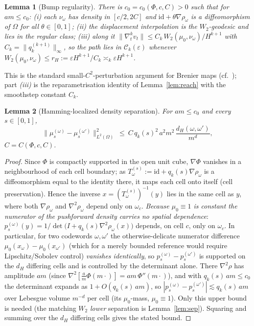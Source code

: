\documentclass[11pt]{article}
\newtheorem{lemma}{Lemma}
\theoremstyle{definition}
\theoremstyle{remark}
\newcommand{\Ck}{\mathcal{C}_k(\varepsilon)}
\begin{document}
\begin{lemma}[Bump regularity]\label{lem:bump}
There is $c_0=c_0(\Phi,c,C)>0$ such that for $am\le c_0$: \emph{(i)} each $\nu_\omega$ has density in
$[c/2,2C]$ and $\mathrm{id}+\theta\nabla\rho_\omega$ is a diffeomorphism of $\Omega$ for all
$\theta\in[0,1]$; \emph{(ii)} the displacement interpolation is the $W_2$-geodesic and lies in the
regular class; \emph{(iii)} along it $\|\nabla_t^k v_t\|\le C_k\,W_2(\mu_0,\nu_\omega)/H^{k+1}$ with
$C_k=\|q_k^{(k+1)}\|_\infty$, so the path lies in $\Ck$ whenever
$W_2(\mu_0,\nu_\omega)\le r_H:=\varepsilon H^{k+1}/C_k\asymp_k\varepsilon H^{k+1}$.
\end{lemma}
This is the standard small-$C^2$-perturbation argument for Brenier maps (cf.\ \cite{hutter,manole});
part \emph{(iii)} is the reparametrisation identity of Lemma~\ref{lem:reach} with the smoothstep
constant $C_k$.

\begin{lemma}[Hamming-localized density separation]\label{lem:kl}
For $am\le c_0$ and every $s\in[0,1]$,
\[
  \big\|\mu_s^{(\omega)}-\mu_s^{(\omega')}\big\|_{L^2(\Omega)}^2\ \le\ C\,q_k(s)^2\,a^2 m^2\,\frac{d_H(\omega,\omega')}{m^d},
\]
$C=C(\Phi,c,C)$.
\end{lemma}
\begin{proof}
Since $\Phi$ is compactly supported in the open unit cube, $\nabla\Phi$ vanishes in a neighbourhood
of each cell boundary; as $T^{(s)}_\omega:=\mathrm{id}+q_k(s)\nabla\rho_\omega$ is a diffeomorphism
equal to the identity there, it maps each cell onto itself (cell preservation). Hence the inverse
$x=(T^{(s)}_\omega)^{-1}(y)$ lies in the same cell as $y$, where both $\nabla\rho_\omega$ and
$\nabla^2\rho_\omega$ depend only on $\omega_c$. \emph{Because $\mu_0\equiv1$ is constant the
numerator of the pushforward density carries no spatial dependence}:
$p_s^{(\omega)}(y)=1/\det\!\big(I+q_k(s)\nabla^2\rho_\omega(x)\big)$ depends, on cell $c$, only on
$\omega_c$. In particular, for two codewords $\omega,\omega'$ the otherwise-delicate numerator
difference $\mu_0(x_\omega)-\mu_0(x_{\omega'})$ (which for a merely bounded reference would require
Lipschitz/Sobolev control) \emph{vanishes identically}, so $p_s^{(\omega)}-p_s^{(\omega')}$ is
supported on the $d_H$ differing cells and is controlled by the determinant alone. There
$\nabla^2\rho$ has amplitude $am$ (since $\nabla^2[\tfrac{a}{m}\Phi(m\cdot)]=am\,\Phi''(m\cdot)$), and
with $q_k(s)\,am\le c_0$ the determinant expands as $1+O(q_k(s)\,am)$, so
$|p_s^{(\omega)}-p_s^{(\omega')}|\lesssim q_k(s)\,am$ over Lebesgue volume $m^{-d}$ per cell (its
$\mu_0$-mass, $\mu_0\equiv1$). Only this upper bound is needed (the matching $W_2$ \emph{lower}
separation is Lemma~\ref{lem:sep}). Squaring and summing over the $d_H$ differing cells gives the
stated bound.
\end{proof}
\end{document}
